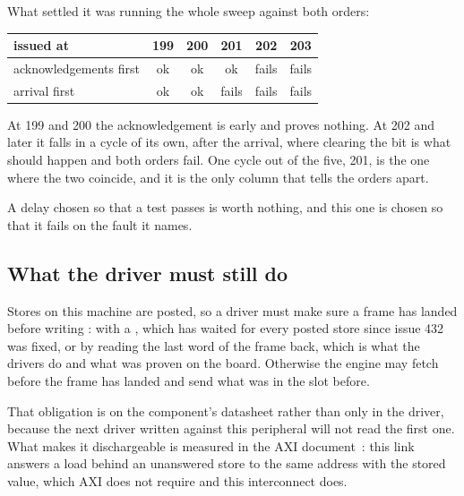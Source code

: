 What settled it was running the whole sweep against both orders:

\begin{center}\footnotesize
\begin{tabular}{@{}lccccc@{}}
\toprule
issued at & 199 & 200 & 201 & 202 & 203 \\
\midrule
acknowledgements first & ok & ok & ok & fails & fails \\
arrival first & ok & ok & fails & fails & fails \\
\bottomrule
\end{tabular}
\end{center}

At 199 and 200 the acknowledgement is early and proves nothing. At
202 and later it falls in a cycle of its own, after the arrival,
where clearing the bit is what should happen and both orders fail.
One cycle out of the five, 201, is the one where the two coincide,
and it is the only column that tells the orders apart.

A delay chosen so that a test passes is worth nothing, and this one
is chosen so that it fails on the fault it names.

\subsection{What the driver must still do}

Stores on this machine are posted, so a driver must make sure a frame
has landed before writing : with a , which
has waited for every posted store since issue 432 was fixed, or by
reading the last word of the frame back, which is what the drivers do
and what was proven on the board. Otherwise the engine may fetch
before the frame has landed and send what was in the slot before.

That obligation is on the component's datasheet rather than only in
the driver, because the next driver written against this peripheral
will not read the first one. What makes it dischargeable is measured
in the AXI document~\cite{axi}: this link answers a load behind an
unanswered store to the same address with the stored value, which AXI
does not require and this interconnect does.



